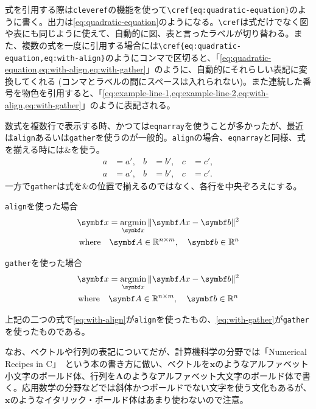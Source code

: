 式を引用する際は\texttt{cleveref}の機能を使って\texttt{\textbackslash cref\{eq:quadratic-equation\}}のように書く。出力は\cref{eq:quadratic-equation}のようになる。\texttt{\textbackslash cref}は式だけでなく図や表にも同じように使えて、自動的に図、表と言ったラベルが切り替わる。また、複数の式を一度に引用する場合には\texttt{\textbackslash cref\{eq:quadratic-equation,eq:with-align\}}のようにコンマで区切ると、「\cref{eq:quadratic-equation,eq:with-align,eq:with-gather}」のように、自動的にそれらしい表記に変換してくれる (コンマとラベルの間にスペースは入れられない)。また連続した番号を物色を引用すると、「\cref{eq:example-line-1,eq:example-line-2,eq:with-align,eq:with-gather}」のように表記される。

数式を複数行で表示する時、かつては\texttt{eqnarray}を使うことが多かったが、最近は\texttt{align}あるいは\texttt{gather}を使うのが一般的。\texttt{align}の場合、\texttt{eqnarray}と同様、式を揃える時には\&を使う。
%
\begin{align}
  a &= a', & b &= b', & c &= c', \label{eq:example-line-1} \\
  a &= a', & b &= b', & c &= c'. \label{eq:example-line-2}
\end{align}
%
一方で\texttt{gather}は式を\&の位置で揃えるのではなく、各行を中央ぞろえにする。
%
\begin{titlebox}{\texttt{align}を使った場合}
  \adjustdisplayskips{1mm}
  \begin{align}
    \mathbf{x} = \argmin_{\mathbf{x}} \| \mathbf{Ax} - \mathbf{b} \|^2 \nonumber \\
    \mbox{where} \quad \mathbf{A} \in \mathbb{R}^{n \times m}, \quad \mathbf{b} \in \mathbb{R}^n \label{eq:with-align}
  \end{align}
\end{titlebox}
%
\begin{titlebox}{\texttt{gather}を使った場合}
  \adjustdisplayskips{1mm}
  \begin{gather}
    \mathbf{x} = \argmin_{\mathbf{x}} \| \mathbf{Ax} - \mathbf{b} \|^2 \nonumber \\
    \mbox{where} \quad \mathbf{A} \in \mathbb{R}^{n \times m}, \quad \mathbf{b} \in \mathbb{R}^n \label{eq:with-gather}
  \end{gather}
\end{titlebox}
%
上記の二つの式で\cref{eq:with-align}が\texttt{align}を使ったもの、\cref{eq:with-gather}が\texttt{gather}を使ったものである。

なお、ベクトルや行列の表記についてだが、計算機科学の分野では「Numerical Recipes in C」~\cite{numrecipes}という本の書き方に倣い、ベクトルを$\mathbf{x}$のようなアルファベット小文字のボールド体、行列を$\mathbf{A}$のようなアルファベット大文字のボールド体で書く。応用数学の分野などでは斜体かつボールドでない文字を使う文化もあるが、$\bm{x}$のようなイタリック・ボールド体はあまり使わないので注意。

